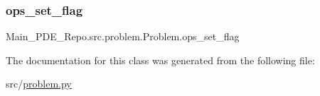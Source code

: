 \subsubsection{\texorpdfstring{ops\+\_\+set\+\_\+flag}{ops\_set\_flag}}
{\footnotesize\ttfamily Main\+\_\+\+P\+D\+E\+\_\+\+Repo.\+src.\+problem.\+Problem.\+ops\+\_\+set\+\_\+flag}



The documentation for this class was generated from the following file\+:\begin{DoxyCompactItemize}
\item 
src/\hyperlink{problem_8py}{problem.\+py}\end{DoxyCompactItemize}
